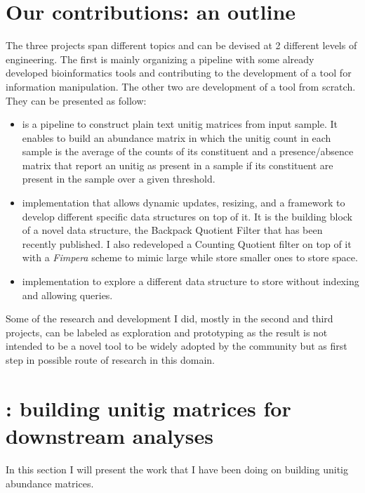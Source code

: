 \section{Our contributions: an outline}
The three projects span different topics and can be devised at 2 different levels of engineering. The first is mainly organizing a pipeline with some already developed bioinformatics tools and contributing to the development of a tool for \kmer information manipulation. The other two are development of a tool from scratch.\\
They can be presented as follow:
\begin{itemize}
	\item[\textbf{\muset}] is a pipeline to construct plain text unitig matrices from input sample. It enables to build an abundance matrix in which the unitig count in each sample is the average of the counts of its constituent \kmers and a presence/absence matrix that report an unitig as present in a sample if its constituent \kmers are present in the sample over a given threshold.\\
	\item[\smash{\stackunder{A \textbf{Quotient}}{\textbf{filter}}}] implementation that allows dynamic updates, resizing, and a framework to develop different specific data structures on top of it. It is the building block of a novel data structure, the Backpack Quotient Filter that has been recently published. I also redeveloped a Counting Quotient filter on top of it with a \emph{Fimpera} scheme to mimic large \kmers while store smaller ones to store space.\\ 
	\item[\smash{\stackunder{A \textbf{Super\kmer}}{\textbf{sorting}}}] implementation to explore a different data structure to store \kmers without indexing and allowing queries.
\end{itemize}
Some of the research and development I did, mostly in the second and third projects, can be labeled as exploration and prototyping as the result is not intended to be a novel tool to be widely adopted by the community but as first step in possible route of research in this domain.

\section{\muset: building unitig matrices for downstream analyses}
In this section I will present the work that I have been doing on building unitig abundance matrices.
